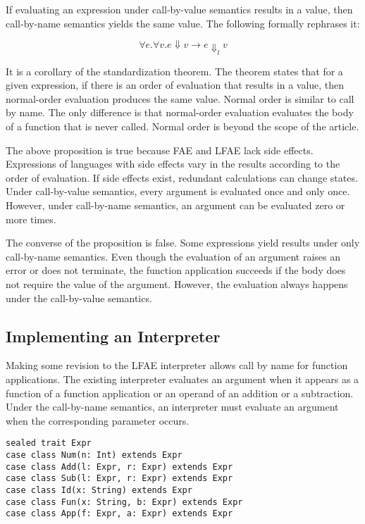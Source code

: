 If evaluating an expression under call-by-value semantics results in a value,
then call-by-name semantics yields the same value. The following formally
rephrases it:

\[
\forall e.\forall v.e\Downarrow v\rightarrow e\Downarrow_l v
\]

It is a corollary of the standardization theorem. The theorem states that for
a given expression, if there is an order of evaluation that results in a value,
then normal-order evaluation produces the same value. Normal order is similar to
call by name. The only difference is that normal-order evaluation evaluates the
body of a function that is never called. Normal order is beyond the scope of the
article.

The above proposition is true because FAE and LFAE lack side effects. Expressions
of languages with side effects vary in the results according to the order of
evaluation. If side effects exist, redundant calculations can change states.
Under call-by-value semantics, every argument is evaluated once and only once.
However, under call-by-name semantics, an argument can be evaluated zero or more
times.

The converse of the proposition is false. Some expressions yield results under
only call-by-name semantics. Even though the evaluation of an argument raises an
error or does not terminate, the function application succeeds if the body does
not require the value of the argument. However, the evaluation always happens
under the call-by-value semantics.

\subsection{Implementing an Interpreter
}

Making some revision to the LFAE interpreter allows call by name for function
applications. The existing interpreter evaluates an argument when it appears as a
function of a function application or an operand of an addition or a subtraction.
Under the call-by-name semantics, an interpreter must evaluate an argument when
the corresponding parameter occurs.

\begin{verbatim}
sealed trait Expr
case class Num(n: Int) extends Expr
case class Add(l: Expr, r: Expr) extends Expr
case class Sub(l: Expr, r: Expr) extends Expr
case class Id(x: String) extends Expr
case class Fun(x: String, b: Expr) extends Expr
case class App(f: Expr, a: Expr) extends Expr
\end{verbatim}

